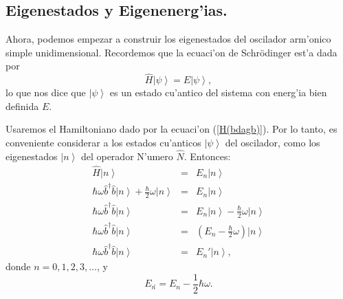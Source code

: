 \subsection{Eigenestados y Eigenenerg'ias.}

Ahora, podemos empezar a construir los eigenestados del oscilador arm'onico
simple unidimensional. Recordemos que la ecuaci'on de Schr\"{o}dinger est'a
dada por%
\begin{equation}
\hat{H}\left| \psi\right> =E\left| \psi\right> ,
\end{equation}
lo que nos dice que $\left| \psi\right> $ es un estado cu'antico
del sistema con energ'ia bien definida $E.$

Usaremos el Hamiltoniano dado por la ecuaci'on (\ref{H(bdagb)}). Por lo tanto, es
conveniente considerar a los estados cu'anticos $\left| \psi
\right> $ del oscilador, como los eigenestados $\left|
n\right> $ del operador N'umero $\hat{N}.$ Entonces:%
\begin{eqnarray}
\hat{H}\left| n\right> & = &E_{n}\left| n\right> \\
\hbar\omega\hat{b}^{\dagger}\hat{b}\left| n\right> +\frac{\hbar}%
{2}\omega\left| n\right> & = &E_{n}\left| n\right> \\
\hbar\omega\hat{b}^{\dagger}\hat{b}\left| n\right> & = &E_{n}%
\left| n\right> -\frac{\hbar}{2}\omega\left| n\right> \\
\hbar\omega\hat{b}^{\dagger}\hat{b}\left| n\right> & = &\left(
E_{n}-\frac{\hbar}{2}\omega\right) \left| n\right> \\
\hbar\omega\hat{b}^{\dagger}\hat{b}\left| n\right> & = &E_{n}'
\left| n\right> ,
\end{eqnarray}
donde  $n=0,1,2,3,\dots $, y
\begin{equation}
E_{n}\acute{}=E_{n}-\frac{1}{2}\hbar\omega .
\end{equation}

